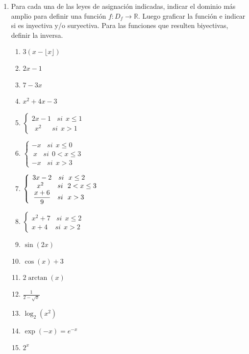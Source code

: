 \documentclass[a4paper]{article}
\newcommand{\exercise}{\item}
\begin{document}
\begin{enumerate}
	\exercise Para cada una de las leyes de asignación indicadas, indicar el dominio más amplio para definir una función $f: D_{f} \to \mathbb{R}$. Luego graficar la función e indicar si es inyectiva y/o suryectiva. Para las funciones que resulten biyectivas, definir la inversa.
	\begin{enumerate} [label=(\alph*)]
		\item $3(x-\lfloor x \rfloor)$
		\item $2x-1$
		\item $7-3x$
		\item $x^2+4x-3$
		\item $\left\{\begin{matrix}2x-1 ~~~~ si ~~x\leq 1\\ ~~x^2~~ ~~~~~ si ~~x>1\end{matrix}\right.$
		\item $\left\{\begin{matrix}-x ~~~~ si ~~x\leq 0\\ ~x  ~~~~  si ~~0<x\leq 3 \\ -x ~~~~ si ~~x>3\end{matrix}\right.$
		\item $\left\{\begin{matrix}\hspace{-2mm}3x-2 ~~~ si ~~x\leq 2 ~~\\ \hspace{-2mm} ~~~~~ x^2 ~~~~~~  si ~~2<x\leq 3 \\ \hspace{-2mm}\displaystyle{\frac{x+6}{9}} ~~~ si ~~x>3 ~~\end{matrix}\right.$
		\item $\left\{\begin{matrix}x^2+7 ~~~~ si ~~x\leq 2\\ x+4 ~~~~~ si ~~x>2\end{matrix}\right.$
		\item $\sin(2x)$
		\item $\cos(x)+3$
		\item $2\arctan(x)$
		\item $\displaystyle{\frac{1}{2-\sqrt{x}}}$
		\item $\log_2(x^2)$
		\item $\exp(-x)=e^{-x}$
		\item $2^x$
	\end{enumerate}


\end{enumerate}
\end{document}
